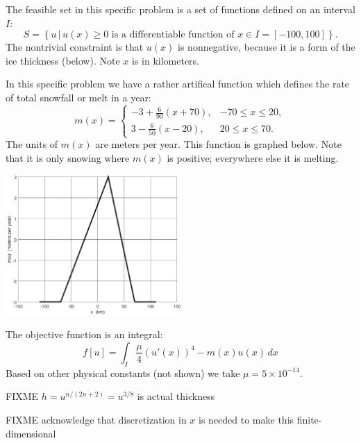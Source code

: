 \documentclass[11pt]{amsart}
\begin{document}
\begin{enumerate}
The feasible set in this specific problem is a set of functions defined on an interval $I$:
    $$S = \left\{u \,\big|\, u(x) \ge 0 \text{ is a differentiable function of } x\in I = [-100,100]\right\}.$$
The nontrivial constraint is that $u(x)$ is nonnegative, because it is a form of the ice thickness (below).  Note $x$ is in kilometers.

In this specific problem we have a rather artifical function which defines the rate of total snowfall or melt in a year:
    $$m(x) = \begin{cases} -3 + \frac{6}{90} (x+70), & -70 \le x \le 20, \\
                            3 - \frac{6}{50} (x-20), & 20 \le x \le 70.
             \end{cases}$$
The units of $m(x)$ are meters per year.  This function is graphed below.  Note that it is only snowing where $m(x)$ is positive; everywhere else it is melting.

\bigskip
\begin{center}
\includegraphics[width=0.5\textwidth]{massbalance}
\end{center}


The objective function is an integral:
    $$f[u] = \int_I \frac{\mu}{4} \left(u'(x)\right)^4 - m(x) u(x)\,dx$$
Based on other physical constants (not shown) we take $\mu = 5 \times 10^{-14}$.

FIXME $h=u^{n/(2n+2)} = u^{3/8}$ is actual thickness

FIXME acknowledge that discretization in $x$ is needed to make this finite-dimensional

\end{enumerate}
\end{document}
